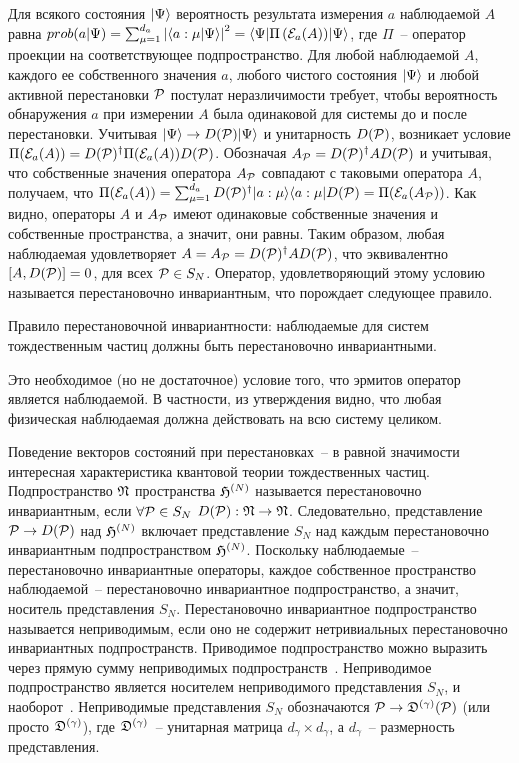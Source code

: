 \documentclass[a4paper, 12pt]{article}
\begin{document}
Для всякого состояния ${\left|\Psi\right\rangle}$ вероятность результата измерения $a$ 
наблюдаемой $A$ равна
${}{{prob}\!\left(a|\Psi\right)} = \sum_{\mu=1}^{d_a}\left|{\left\langle a:\mu\middle|\Psi\right\rangle}\right|^2 =
{\left\langle\Psi\middle|\Pi\left({\mathcal{E}}_a(A)\right)\middle|\Psi\right\rangle}$,
где $\Pi$~-- оператор проекции на соответствующее подпространство.
%
Для любой наблюдаемой $A$, каждого ее собственного значения $a$, любого 
чистого состояния ${\left|\Psi\right\rangle}$ и любой активной перестановки ${\mathcal{P}}$ 
постулат неразличимости требует, чтобы вероятность обнаружения $a$ при 
измерении $A$ была одинаковой для системы до и после перестановки.
%
Учитывая ${\left|\Psi\right\rangle}\to D({\mathcal{P}}){\left|\Psi\right\rangle}$ и унитарность $D({\mathcal{P}})$, 
возникает условие $\Pi({\mathcal{E}}_a(A)) = D({\mathcal{P}})^\dag \Pi({\mathcal{E}}_a(A)) D({\mathcal{P}})$.
Обозначая $A_{\mathcal{P}} = D({\mathcal{P}})^\dag A D({\mathcal{P}})$ и учитывая, что 
собственные значения оператора $A_{\mathcal{P}}$ совпадают с таковыми оператора 
$A$, получаем, что $\Pi({\mathcal{E}}_a(A)) = \sum_{\mu=1}^{d_a}
D({\mathcal{P}})^\dag {\left|a:\mu\right\rangle}{\left\langle a:\mu\right|}D({\mathcal{P}}) = \Pi({\mathcal{E}}_a(A_{\mathcal{P}}))$.
%
Как видно, операторы $A$ и $A_{\mathcal{P}}$ имеют одинаковые собственные 
значения и собственные пространства, а значит, они равны. Таким образом, 
любая наблюдаемая удовлетворяет $A = A_{\mathcal{P}} = D({\mathcal{P}})^\dag 
A D({\mathcal{P}})$, что эквивалентно $[A, D({\mathcal{P}})] = 0$, для всех ${\mathcal{P}}\in 
S_N$.
%
Оператор, удовлетворяющий этому условию называется 
перестановочно инвариантным, что порождает следующее правило.

Правило перестановочной инвариантности: наблюдаемые для систем 
тождественным частиц должны быть перестановочно инвариантными.

Это необходимое (но не достаточное) условие того, что эрмитов оператор 
является наблюдаемой. В частности, из утверждения видно, что любая 
физическая наблюдаемая должна действовать на всю систему целиком.

Поведение векторов состояний при перестановках~-- в равной значимости 
интересная характеристика квантовой теории тождественных частиц. 
Подпространство ${\mathfrak{N}}$ пространства $\mathfrak{H}^{(N)}$ называется 
перестановочно инвариантным, если $\forall {\mathcal{P}}\in S_N$ 
$D({\mathcal{P}}):{\mathfrak{N}} \to {\mathfrak{N}}$. Следовательно, представление ${\mathcal{P}}\to 
D({\mathcal{P}})$ над $\mathfrak{H}^{(N)}$ включает представление $S_N$ над каждым 
перестановочно инвариантным подпространством $\mathfrak{H}^{(N)}$.
%
Поскольку наблюдаемые~-- перестановочно инвариантные операторы, каждое 
собственное пространство наблюдаемой~-- перестановочно инвариантное 
подпространство, а значит, носитель представления $S_N$.
%
Перестановочно инвариантное подпространство называется неприводимым, 
если оно не содержит нетривиальных перестановочно инвариантных 
подпространств. Приводимое подпространство можно выразить через прямую 
сумму неприводимых подпространств~\cite[Гл.~3--13]{ref14}.
Неприводимое подпространство является носителем неприводимого 
представления $S_N$, и наоборот~\cite[Гл.~7]{ref14}.
Неприводимые представления $S_N$ обозначаются ${\mathcal{P}} \to 
{\mathfrak{D}^{(\gamma)}}{}({\mathcal{P}})$ (или просто ${\mathfrak{D}^{(\gamma)}}{}$), где ${\mathfrak{D}^{(\gamma)}}{}$~-- 
унитарная матрица $d_\gamma \times d_\gamma$, а $d_\gamma$~-- 
размерность представления.
\end{document}
